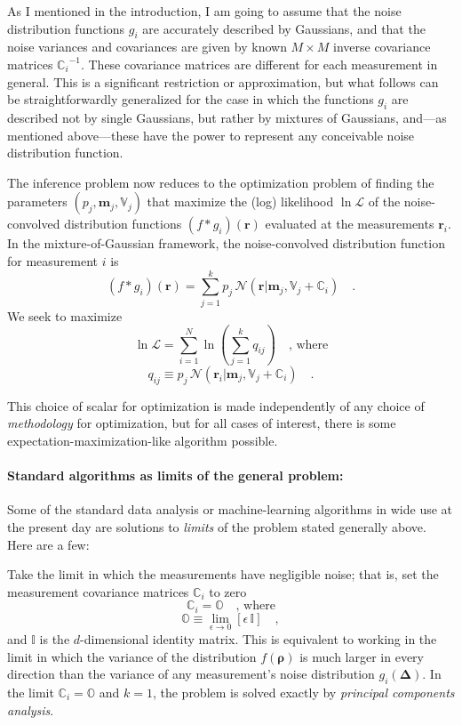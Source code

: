 \documentclass[12pt]{article}
\newcommand{\Mvector}[1]{\boldsymbol{#1}}
\newcommand{\measurement}{\Mvector{r}}
\newcommand{\truepoint}{\Mvector{\rho}}
\newcommand{\noise}{\Mvector{\Delta}}
\newcommand{\measurementi}{\measurement_i}
\newcommand{\mean}{\Mvector{m}}
\newcommand{\meanj}{\mean_j}
\newcommand{\truedist}{f}
\newcommand{\noisedisti}{g_i}
\newcommand{\gaussian}{\mathcal{N}\!}
\newcommand{\lnlike}{\ln\mathcal{L}}
\newcommand{\ampj}{p_j}
\newcommand{\ampij}{q_{ij}}
\newcommand{\Mmatrix}[1]{\mathbb{#1}}
\newcommand{\varj}{\Mmatrix{V}_j}
\newcommand{\covari}{\Mmatrix{C}_i}
\newcommand{\zero}{\Mmatrix{O}}
\newcommand{\identity}{\Mmatrix{I}}
\newcommand{\inverse}[1]{{#1}^{-1}}
\newcommand{\invcovari}{\inverse{\covari}}
\begin{document}
As I mentioned in the introduction, I am going to assume that the
noise distribution functions $\noisedisti$ are accurately described by
Gaussians, and that the noise variances and covariances are given by
known $M\times M$ inverse covariance matrices $\invcovari$.  These
covariance matrices are different for each measurement in general.
This is a significant restriction or approximation, but what follows
can be straightforwardly generalized for the case in which the
functions $\noisedisti$ are described not by single Gaussians, but
rather by mixtures of Gaussians, and---as mentioned above---these have
the power to represent any conceivable noise distribution function.

The inference problem now reduces to the optimization problem of
finding the parameters $(\ampj,\meanj,\varj)$ that maximize the (log)
likelihood $\lnlike$ of the noise-convolved distribution functions
$(\truedist * \noisedisti)(\measurement)$ evaluated at the
measurements $\measurementi$.  In the mixture-of-Gaussian framework,
the noise-convolved distribution function for measurement $i$ is
\begin{equation}
(\truedist * \noisedisti)(\measurement) =
  \sum_{j=1}^k\ampj\,\gaussian(\measurement|\meanj,\varj+\covari)
\quad .
\end{equation}
We seek to maximize
\begin{equation}
\lnlike = \sum_{i=1}^N
  \ln\left( \sum_{j=1}^k\ampij \right)
\quad \mbox{, where}
\end{equation}
\begin{equation}
\ampij\equiv \ampj\,\gaussian(\measurementi|\meanj,\varj+\covari)
\quad .
\end{equation}

This choice of scalar for optimization is made independently of any
choice of \emph{methodology} for optimization, but for all cases of
interest, there is some expectation-maximization-like algorithm
possible.

\paragraph{Standard algorithms as limits of the general problem:}
Some of the standard data analysis or machine-learning algorithms in
wide use at the present day are solutions to \emph{limits} of the
problem stated generally above.  Here are a few:

Take the limit in which the measurements have negligible noise;
that is, set the measurement covariance matrices $\covari$ to zero
\begin{equation}
\covari = \zero \quad \mbox{, where}
\end{equation}
\begin{equation}
\zero \equiv \lim_{\epsilon \rightarrow 0} [\epsilon\,\identity]
\quad ,
\end{equation}
and $\identity$ is the $d$-dimensional identity matrix.  This is
equivalent to working in the limit in which the variance of the
distribution $\truedist(\truepoint)$ is much larger in every direction
than the variance of any measurement's noise distribution
$\noisedisti(\noise)$.  In the limit $\covari=\zero$ and $k=1$, the
problem is solved exactly by \emph{principal components analysis}.
\end{document}
